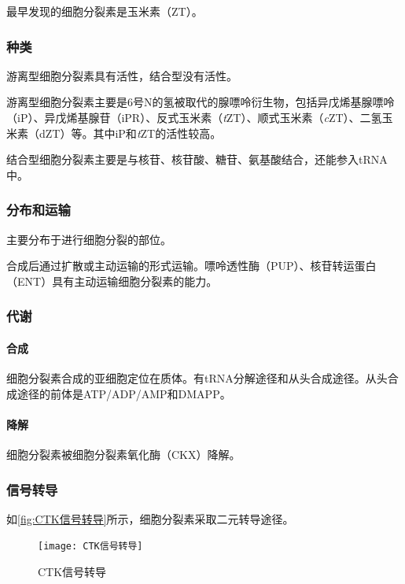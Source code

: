 最早发现的细胞分裂素是玉米素（ZT）。

\subsubsection{种类}

游离型细胞分裂素具有活性，结合型没有活性。

游离型细胞分裂素主要是6号N的氢被取代的腺嘌呤衍生物，包括异戊烯基腺嘌呤（iP）、异戊烯基腺苷（iPR）、反式玉米素（\textit{t}ZT）、顺式玉米素（\textit{c}ZT）、二氢玉米素（dZT）等。其中iP和\textit{t}ZT的活性较高。

结合型细胞分裂素主要是与核苷、核苷酸、糖苷、氨基酸结合，还能参入tRNA中。

\subsubsection{分布和运输}

主要分布于进行细胞分裂的部位。

合成后通过扩散或主动运输的形式运输。嘌呤透性酶（PUP）、核苷转运蛋白（ENT）具有主动运输细胞分裂素的能力。

\subsubsection{代谢}

\paragraph{合成}

细胞分裂素合成的亚细胞定位在质体。有tRNA分解途径和从头合成途径。从头合成途径的前体是ATP/ADP/AMP和DMAPP。

\paragraph{降解}

细胞分裂素被细胞分裂素氧化酶（CKX）降解。

\subsubsection{信号转导}

如\autoref{fig:CTK信号转导}所示，细胞分裂素采取二元转导途径。

\begin{figure}[htbp]
	\centering
	\texttt{[image: CTK信号转导]}
	\caption{CTK信号转导}
	\label{fig:CTK信号转导}
\end{figure}



